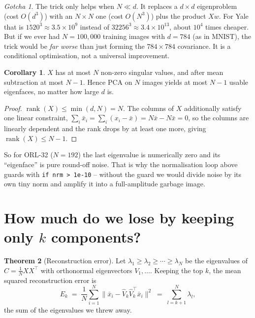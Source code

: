 \documentclass[11pt]{article}
\theoremstyle{definition}
\newtheorem{theorem}{Theorem}[section]
\newtheorem{corollary}[theorem]{Corollary}
\theoremstyle{remark}
\newtheorem*{gotcha}{Gotcha}
\newcommand{\rank}{\operatorname{rank}}
\begin{document}
\begin{gotcha}
The trick only helps when $N \ll d$. It replaces a $d\times d$ eigenproblem
(cost $O(d^3)$) with an $N\times N$ one (cost $O(N^3)$) plus the product $Xw$.
For Yale that is $1520^3\approx 3.5\times10^9$ instead of
$32256^3\approx 3.4\times10^{13}$, about $10^4$ times cheaper. But if we ever had
$N=100{,}000$ training images with $d=784$ (as in MNIST), the trick would be
\emph{far worse} than just forming the $784\times784$ covariance. It is a
conditional optimisation, not a universal improvement.
\end{gotcha}

\begin{corollary}\label{cor:rank}
$X$ has at most $N$ non-zero singular values, and after mean subtraction at most
$N-1$. Hence PCA on $N$ images yields at most $N-1$ usable eigenfaces, no matter
how large $d$ is.
\end{corollary}
\begin{proof}
$\rank(X)\le\min(d,N)=N$. The columns of $X$ additionally satisfy one linear
constraint, $\sum_i \bar{x}_i = \sum_i (x_i-\bar{x}) = N\bar{x} - N\bar{x} = 0$, so the columns are
linearly dependent and the rank drops by at least one more, giving
$\rank(X)\le N-1$.
\end{proof}

So for ORL-32 ($N=192$) the last eigenvalue is numerically zero and its
``eigenface'' is pure round-off noise. That is why the normalisation loop above
guards with \texttt{if nrm > 1e-10} -- without the guard we would divide noise by
its own tiny norm and amplify it into a full-amplitude garbage image.

\section{How much do we lose by keeping only \texorpdfstring{$k$}{k} components?}

\begin{theorem}[Reconstruction error]\label{thm:recon}
Let $\lambda_1\ge\lambda_2\ge\cdots\ge\lambda_N$ be the eigenvalues of
$C=\frac1N XX^{\!\top}$ with orthonormal eigenvectors $V_1,\dots$. Keeping the top
$k$, the mean squared reconstruction error is
\[
  E_k \;=\; \frac1N \sum_{i=1}^{N}\bigl\|\bar{x}_i - \hat{V}_k\hat{V}_k^{\!\top} \bar{x}_i\bigr\|^2
        \;=\; \sum_{l=k+1}^{N}\lambda_l ,
\]
the sum of the eigenvalues we threw away.
\end{theorem}
\end{document}
